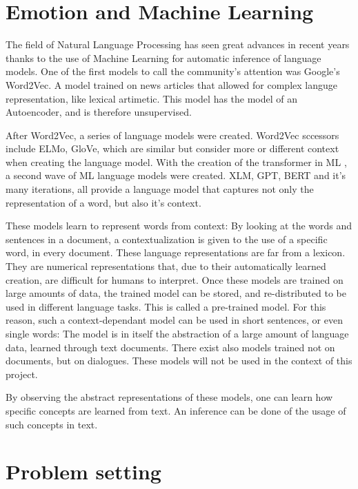 \section{Emotion and Machine Learning}\label{sec:Emotion and Machine Learning}
The field of Natural Language Processing has seen great advances in recent years thanks to the use of Machine Learning for automatic inference of language models. One of the first models to call the community's attention was Google's Word2Vec\cite{mikolov2013word2vec}. A model trained on news articles that allowed for complex languge representation, like lexical artimetic. This model has the model of an Autoencoder, and is therefore unsupervised.

After Word2Vec, a series of language models were created. Word2Vec sccessors include ELMo, GloVe, which are similar but consider more or different context when creating the language model. With the creation of the transformer in ML \cite{vaswani2017transformer}, a second wave of ML language models were created. XLM, GPT, BERT and it's many iterations, all provide a language model that captures not only the representation of a word, but also it's context.

These models learn to represent words from context: By looking at the words and sentences in a document, a contextualization is given to the use of a specific word, in every document. These language representations are far from a lexicon. They are numerical representations that, due to their automatically learned creation, are difficult for humans to interpret. Once these models are trained on large amounts of data, the trained model can be stored, and re-distributed to be used in different language tasks. This is called a pre-trained model. For this reason, such a context-dependant model can be used in short sentences, or even single words: The model is in itself the abstraction of a large amount of language data, learned through text documents.
There exist also models trained not on documents, but on dialogues. These models will not be used in the context of this project.

By observing the abstract representations of these models, one can learn how specific concepts are learned from text. An inference can be done of the usage of such concepts in text.

\section{Problem setting}\label{sec:Problem setting}


